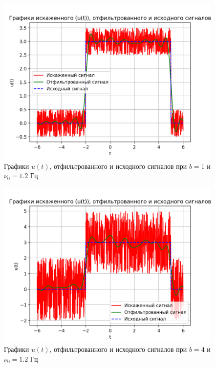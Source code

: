 \begin{figure}[ht!]
    \centering
    \includegraphics[scale=0.85]{media/1 task/high_freq/Cleaned_1_-1,1981981981981982.png}
    \caption{Графики  $u(t)$, отфильтрованного и исходного сигналов при $b=1$ и $\nu_0=1.2$ Гц} 
    \label{fig:cleaned_1_12}
\end{figure}

\begin{figure}[ht!]
    \centering
    \includegraphics[scale=0.85]{media/1 task/high_freq/Cleaned_4_-1,1981981981981982.png}
    \caption{Графики  $u(t)$, отфильтрованного и исходного сигналов при $b=4$ и $\nu_0=1.2$ Гц}
    \label{fig:cleaned_4_12}
\end{figure}

